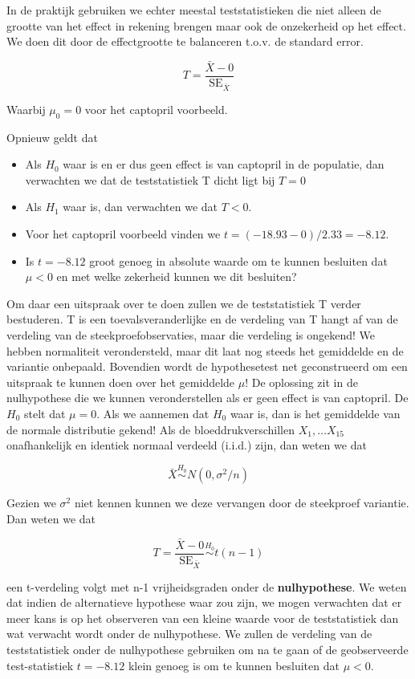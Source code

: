 \documentclass[
  12pt,dutch,coursenotes]{book}
\providecommand{\tightlist}{%
  \setlength{\itemsep}{0pt}\setlength{\parskip}{0pt}}
\theoremstyle{definition}
\theoremstyle{definition}
\theoremstyle{definition}
\theoremstyle{remark}
\begin{document}
In de praktijk gebruiken we echter meestal teststatistieken die niet alleen de grootte van het effect in rekening brengen maar ook de onzekerheid op het effect.
We doen dit door de effectgrootte te balanceren t.o.v. de standard error.

\[T=\frac{\bar{X}-0}{\text{SE}_{\bar X}}\]

Waarbij \(\mu_0=0\) voor het captopril voorbeeld.

Opnieuw geldt dat

\begin{itemize}
\tightlist
\item
  Als \(H_0\) waar is en er dus geen effect is van captopril in de populatie, dan verwachten we dat de teststatistiek T dicht ligt bij \(T=0\)
\item
  Als \(H_1\) waar is, dan verwachten we dat \(T<0\).
\item
  Voor het captopril voorbeeld vinden we \(t=(-18.93-0)/2.33=-8.12\).
\item
  Is \(t = -8.12\) groot genoeg in absolute waarde om te kunnen besluiten dat \(\mu < 0\) en met welke zekerheid kunnen we dit besluiten?
\end{itemize}

Om daar een uitspraak over te doen zullen we de teststatistiek T verder bestuderen.
T is een toevalsveranderlijke en de verdeling van T hangt af van de verdeling van de steekproefobservaties, maar die verdeling is ongekend!
We hebben normaliteit verondersteld, maar dit laat nog steeds het gemiddelde en de variantie onbepaald.
Bovendien wordt de hypothesetest net geconstrueerd om een uitspraak te kunnen doen over het gemiddelde \(\mu\)!
De oplossing zit in de nulhypothese die we kunnen veronderstellen als er geen effect is van captopril.
De \(H_0\) stelt dat \(\mu=0\).
Als we aannemen dat \(H_0\) waar is, dan is het gemiddelde van de normale distributie gekend!
Als de bloeddrukverschillen \(X_1, \ldots X_{15}\) onafhankelijk en identiek normaal verdeeld (i.i.d.) zijn, dan weten we dat

\[\bar X  \stackrel{H_0}{\sim} N(0, \sigma^2/n)\]

Gezien we \(\sigma^2\) niet kennen kunnen we deze vervangen door de steekproef variantie. Dan weten we dat

\[T=\frac{\bar{X}-0}{\text{SE}_{\bar X}}\stackrel{H_0}{\sim} t(n-1) \]

een t-verdeling volgt met n-1 vrijheidsgraden onder de \textbf{nulhypothese}.
We weten dat indien de alternatieve hypothese waar zou zijn, we mogen verwachten dat er meer kans is op het observeren van een kleine waarde voor de teststatistiek dan wat verwacht wordt onder de nulhypothese.
We zullen de verdeling van de teststatistiek onder de nulhypothese gebruiken om na te gaan of de geobserveerde test-statistiek \(t = -8.12\) klein genoeg is om te kunnen besluiten dat \(\mu < 0\).
\end{document}

